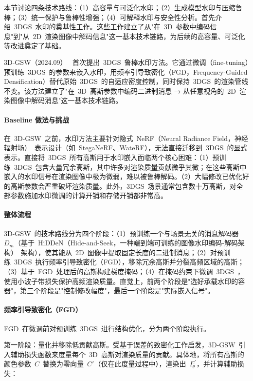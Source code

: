 本节讨论四条技术路线：（1）高容量与可泛化水印；（2）生成模型水印与压缩鲁棒；（3）统一保护与鲁棒性增强；（4）可解释水印与安全性分析。首先介绍~3DGS~水印的奠基性工作。这些工作建立了从"在~3D~参数中编码信息"到"从~2D~渲染图像中解码信息"这一基本技术链路，为后续的高容量、可泛化等改进奠定了基础。

3D-GSW（2024.09）~\cite{2409_13222} 首次提出~3DGS~鲁棒水印方法。它通过微调（fine-tuning）预训练~3DGS~的参数来嵌入水印，用频率引导致密化（FGD，Frequency-Guided Densification）替代原始~3DGS~的自适应密度控制，同时保持~3DGS~的渲染管线不变。该方法建立了"在~3D~高斯参数中编码二进制消息 → 从任意视角的~2D~渲染图像中解码消息"这一基本技术链路。

\paragraph{Baseline 做法与挑战}
在~3D-GSW~之前，水印方法主要针对隐式~NeRF（Neural Radiance Field，神经辐射场）~表示设计（如~StegaNeRF、WateRF），无法直接迁移到~3DGS~的显式表示。直接将~3DGS~所有高斯用于水印嵌入面临两个核心困难：（1）预训练~3DGS~包含大量冗余高斯，其中许多对渲染质量贡献微乎其微；在这些高斯中嵌入的水印信号在渲染图像中极为微弱，难以被鲁棒解码。（2）大幅修改已优化好的高斯参数会严重破坏渲染质量。此外，3DGS~场景通常包含数十万高斯，对全部参数施加水印微调的计算开销和存储开销都非常高。

\paragraph{整体流程}
3D-GSW~的技术路线分为四个阶段：（1）预训练一个与场景无关的消息解码器~$D_m$（基于~HiDDeN（Hide-and-Seek，一种端到端可训练的图像水印编码-解码架构）~架构），使其能从~2D~图像中提取固定长度的二进制消息；（2）对预训练~3DGS~执行频率引导致密化（FGD），移除冗余高斯并分裂高频区域的高斯；（3）基于~FGD~处理后的高斯构建梯度掩码；（4）在掩码约束下微调~3DGS~，使用小波子带损失保护高频渲染质量。直觉上，前两个阶段是"选好承载水印的容器"，第三个阶段是"控制修改幅度"，最后一个阶段是"实际嵌入信号"。

\paragraph{频率引导致密化（FGD）}
FGD~在微调前对预训练~3DGS~进行结构优化，分为两个阶段执行。

第一阶段：量化并移除低贡献高斯。受基于误差的致密化工作启发，3D-GSW~引入辅助损失函数来度量每个~3D~高斯对渲染质量的贡献。具体地，将所有高斯的颜色参数~$C$~替换为零向量~$C'$（仅在此度量过程中），渲染出~$I^{c'}_\theta$，并计算辅助损失：

